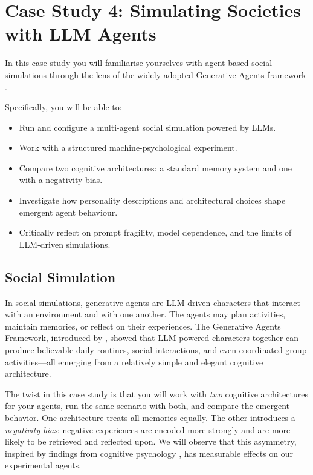\chapter{Case Study 4: Simulating Societies with LLM Agents}\label{chap:generative_agents}

\begin{learningbox}

In this case study you will familiarise yourselves with agent-based social simulations through the lens of the widely adopted Generative Agents framework \citep{park2023generative}.

Specifically, you will be able to:

\begin{itemize}[leftmargin=*, nosep]
    \item Run and configure a multi-agent social simulation powered by LLMs.
    \item Work with a structured machine-psychological experiment.
    \item Compare two cognitive architectures: a standard memory system and one with a negativity bias.
    \item Investigate how personality descriptions and architectural choices shape emergent agent behaviour.
    \item Critically reflect on prompt fragility, model dependence, and the limits of LLM-driven simulations.
\end{itemize}

\end{learningbox}


\section{Social Simulation}
In social simulations, generative agents are LLM-driven characters that interact with an environment and with one another. The agents may plan activities, maintain memories, or reflect on their experiences. The Generative Agents Framework, introduced by \citet{park2023generative}, showed that LLM-powered characters together can produce believable daily routines, social interactions, and even coordinated group activities---all emerging from a relatively simple and elegant cognitive architecture.

The twist in this case study is that you will work with \emph{two} cognitive architectures for your agents, run the same scenario with both, and compare the emergent behavior. One architecture treats all memories equally. The other introduces a \emph{negativity bias}: negative experiences are encoded more strongly and are more likely to be retrieved and reflected upon. We will observe that this asymmetry, inspired by findings from cognitive psychology \citep{baumeister2001bad}, has measurable effects on our experimental agents.

